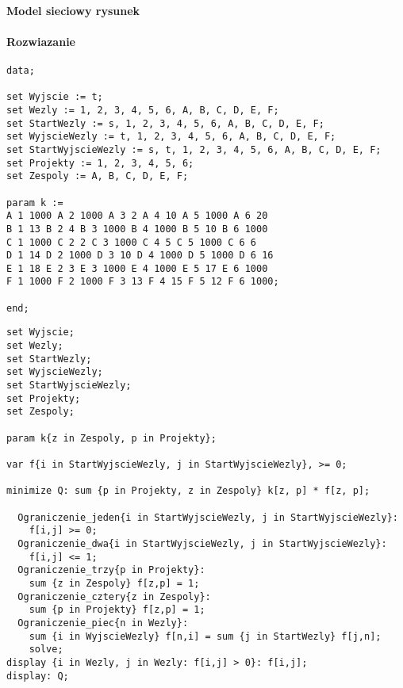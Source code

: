 \documentclass[12pt]{article}
\begin{document}
\paragraph{Model sieciowy rysunek}

\paragraph{Rozwiazanie}
\begin{lstlisting}[caption= plik dat]
data; 
 
set Wyjscie := t; 
set Wezly := 1, 2, 3, 4, 5, 6, A, B, C, D, E, F; 
set StartWezly := s, 1, 2, 3, 4, 5, 6, A, B, C, D, E, F; 
set WyjscieWezly := t, 1, 2, 3, 4, 5, 6, A, B, C, D, E, F; 
set StartWyjscieWezly := s, t, 1, 2, 3, 4, 5, 6, A, B, C, D, E, F; 
set Projekty := 1, 2, 3, 4, 5, 6; 
set Zespoly := A, B, C, D, E, F; 
 
param k := 
A 1 1000 A 2 1000 A 3 2 A 4 10 A 5 1000 A 6 20
B 1 13 B 2 4 B 3 1000 B 4 1000 B 5 10 B 6 1000 
C 1 1000 C 2 2 C 3 1000 C 4 5 C 5 1000 C 6 6 
D 1 14 D 2 1000 D 3 10 D 4 1000 D 5 1000 D 6 16 
E 1 18 E 2 3 E 3 1000 E 4 1000 E 5 17 E 6 1000 
F 1 1000 F 2 1000 F 3 13 F 4 15 F 5 12 F 6 1000; 
 
end; 
\end{lstlisting}
\begin{lstlisting}[caption= plik mod]
set Wyjscie; 
set Wezly; 
set StartWezly; 
set WyjscieWezly; 
set StartWyjscieWezly; 
set Projekty; 
set Zespoly; 
 
param k{z in Zespoly, p in Projekty}; 
 
var f{i in StartWyjscieWezly, j in StartWyjscieWezly}, >= 0; 
 
minimize Q: sum {p in Projekty, z in Zespoly} k[z, p] * f[z, p]; 
 
  Ograniczenie_jeden{i in StartWyjscieWezly, j in StartWyjscieWezly}: 
    f[i,j] >= 0; 
  Ograniczenie_dwa{i in StartWyjscieWezly, j in StartWyjscieWezly}: 
    f[i,j] <= 1; 
  Ograniczenie_trzy{p in Projekty}: 
    sum {z in Zespoly} f[z,p] = 1; 
  Ograniczenie_cztery{z in Zespoly}: 
    sum {p in Projekty} f[z,p] = 1; 
  Ograniczenie_piec{n in Wezly}: 
    sum {i in WyjscieWezly} f[n,i] = sum {j in StartWezly} f[j,n]; 
	solve; 
display {i in Wezly, j in Wezly: f[i,j] > 0}: f[i,j]; 
display: Q;



\end{lstlisting}
\end{document}
